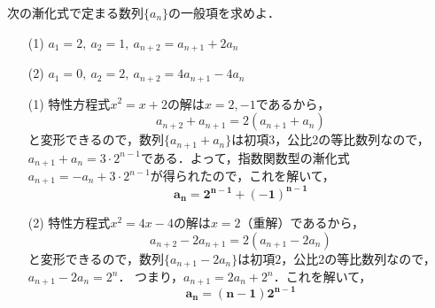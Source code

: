 \documentclass[a4paper,11pt]{ltjsarticle}
\begin{document}
   \begin{toi}
次の漸化式で定まる数列$\{a_n\}$の一般項を求めよ．\\
\begin{minipage}{0.5\linewidth}
\begin{itemize}
    \item [(1)]    $a_1=2,~a_2=1,~a_{n+2}=a_{n+1}+2a_n$
\end{itemize}
\end{minipage}
\begin{minipage}{0.5\linewidth}
\begin{itemize}
    \item [(2)]$a_1=0,~a_2=2,~a_{n+2}=4a_{n+1}-4a_n$
\end{itemize}
\end{minipage}
\end{toi}
\ans 
\begin{itemize}
    \item [(1)] 特性方程式$x^2=x+2$の解は$x=2,-1$であるから，
  \[a_{n+2}+a_{n+1}=2(a_{n+1}+a_n)\]
  と変形できるので，数列$\{a_{n+1}+a_n\}$は初項$3$，公比2の等比数列なので，$a_{n+1}+a_n=3\cdot2^{n-1}$である．よって，指数関数型の漸化式$a_{n+1}=-a_n+3\cdot2^{n-1}$が得られたので，これを解いて，
  \[\boldsymbol{a_n=2^{n-1}+(-1)^{n-1}}\]

\item[(2)] 特性方程式$x^2=4x-4$の解は$x=2$（重解）であるから，
  \[a_{n+2}-2a_{n+1}=2(a_{n+1}-2a_n)\]
  と変形できるので，数列$\{a_{n+1}-2a_n\}$は初項$2$，公比2の等比数列なので，$a_{n+1}-2a_n=2^n$．
つまり，$a_{n+1}=2a_n+2^n$．これを解いて，
  \[\boldsymbol{a_n=(n-1)2^{n-1}}\]
\end{itemize}
\end{document}
